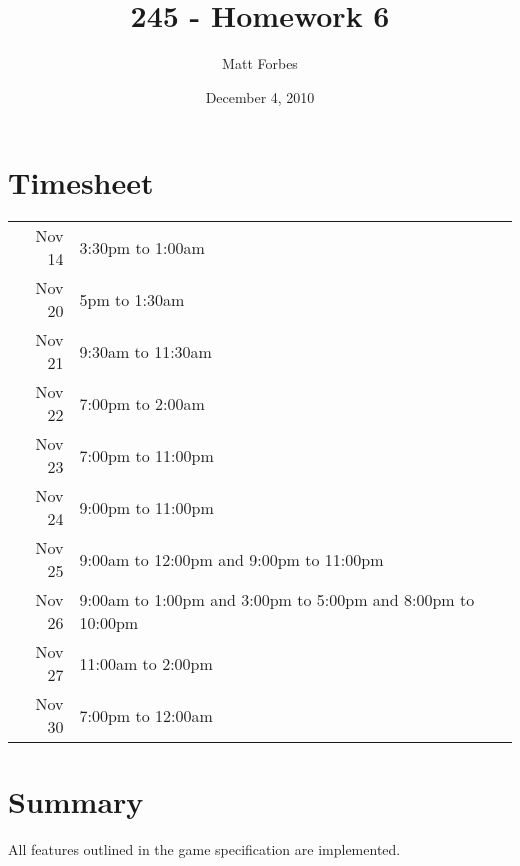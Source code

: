 \documentclass[a4paper,12pt]{article}
\begin{document}
\title{245 - Homework 6}
\author{Matt Forbes}
\date{December 4, 2010}
\maketitle

\pagebreak

\section*{Timesheet}

\begin{tabular}{r l}

  Nov 14 & 3:30pm to 1:00am\\

  Nov 20 & 5pm to 1:30am \\

  Nov 21 & 9:30am to 11:30am \\

  Nov 22 & 7:00pm to 2:00am \\

  Nov 23 & 7:00pm to 11:00pm \\

  Nov 24 & 9:00pm to 11:00pm \\

  Nov 25 & 9:00am to 12:00pm and 9:00pm to 11:00pm \\

  Nov 26 & 9:00am to 1:00pm and 3:00pm to 5:00pm and 8:00pm to 10:00pm \\

  Nov 27 & 11:00am to 2:00pm \\

  Nov 30 & 7:00pm to 12:00am
  
\end{tabular}

\section*{Summary}

All features outlined in the game specification are implemented.
\end{document}

